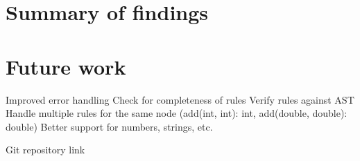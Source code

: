 \documentclass[nofilelist]{cslthse-msc}
\begin{document}
\section{Summary of findings}
\section{Future work}
Improved error handling
Check for completeness of rules
Verify rules against AST
Handle multiple rules for the same node (add(int, int): int, add(double, double): double)
Better support for numbers, strings, etc.


{} %

\begin{appendices} %
Git repository link

\printfilelist

\checkoddpage
\ifoddpage
\else
   \newpage
   \thispagestyle{empty}
   \mbox{ }
\fi

\end{appendices}
\end{document}
